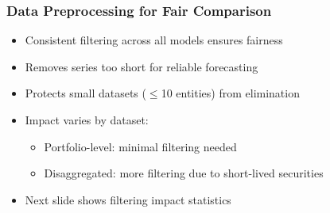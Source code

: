 \documentclass[ignorenonframetext, 9pt]{beamer}
\begin{document}
\begin{frame}
  \frametitle{Data Preprocessing for Fair Comparison}
  \begin{itemize}
  \item Consistent filtering across all models ensures fairness
  \item Removes series too short for reliable forecasting
  \item Protects small datasets ($\leq$10 entities) from elimination
  \item Impact varies by dataset:
  \begin{itemize}
    \item Portfolio-level: minimal filtering needed
    \item Disaggregated: more filtering due to short-lived securities
  \end{itemize}
  \item Next slide shows filtering impact statistics
  \end{itemize}
\end{frame}

\begin{frame}[plain]
    \centering
    \vspace{0.2cm}
    \scalebox{0.9}{%
    
    }
  \end{frame}
\end{document}
